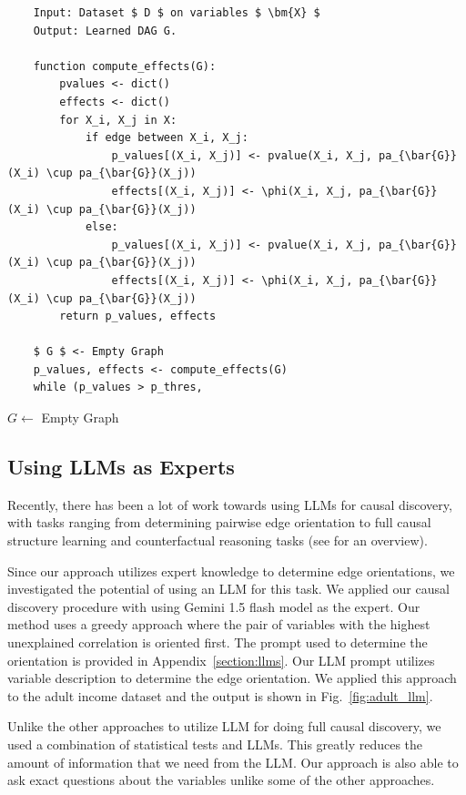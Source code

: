 \documentclass{uai2025} %
\begin{document}
\begin{verbatim}
	Input: Dataset $ D $ on variables $ \bm{X} $
	Output: Learned DAG G.
	
	function compute_effects(G):
		pvalues <- dict()
		effects <- dict()
		for X_i, X_j in X:
			if edge between X_i, X_j:
				p_values[(X_i, X_j)] <- pvalue(X_i, X_j, pa_{\bar{G}}(X_i) \cup pa_{\bar{G}}(X_j))
				effects[(X_i, X_j)] <- \phi(X_i, X_j, pa_{\bar{G}}(X_i) \cup pa_{\bar{G}}(X_j))
			else:
				p_values[(X_i, X_j)] <- pvalue(X_i, X_j, pa_{\bar{G}}(X_i) \cup pa_{\bar{G}}(X_j))
				effects[(X_i, X_j)] <- \phi(X_i, X_j, pa_{\bar{G}}(X_i) \cup pa_{\bar{G}}(X_j))
		return p_values, effects
	
	$ G $ <- Empty Graph
	p_values, effects <- compute_effects(G)
	while (p_values > p_thres, 
\end{verbatim}

\begin{algorithm}
	\BlankLine
	$ G \leftarrow $ Empty Graph
\end{algorithm}


\subsection{Using LLMs as Experts}
Recently, there has been a lot of work towards using LLMs for causal discovery,
with tasks ranging from determining pairwise edge orientation
\citep{Kiciman2023, Jin2024} to full causal structure learning \citep{Naik2023,
Vashishtha2023} and counterfactual reasoning tasks\citep{Kiciman2023} (see
\citet{Liu2024} for an overview).

Since our approach utilizes expert knowledge to determine edge orientations, we
investigated the potential of using an LLM for this task. We applied our causal
discovery procedure with using Gemini 1.5 flash model as the expert. Our method
uses a greedy approach where the pair of variables with the highest unexplained
correlation is oriented first. The prompt used to determine the orientation is
provided in Appendix~\ref{section:llms}. Our LLM prompt utilizes variable
description to determine the edge orientation. We applied this approach to the
adult income dataset and the output is shown in Fig.~\ref{fig:adult_llm}. 

Unlike the other approaches to utilize LLM for doing full causal discovery, we 
used a combination of statistical tests and LLMs. This greatly reduces the
amount of information that we need from the LLM. Our approach is also able to 
ask exact questions about the variables unlike some of the other approaches.
\end{document}

